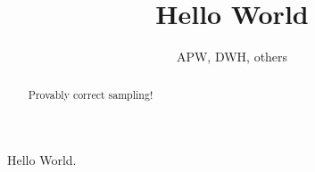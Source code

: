 \documentclass[12pt, preprint]{aastex}
\begin{document}
\title{Hello World}
\author{APW, DWH, others}

\begin{abstract}
Provably correct sampling!
\end{abstract}


Hello World.
\end{document}
